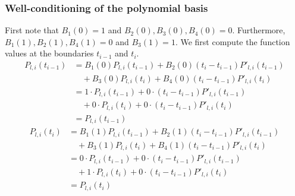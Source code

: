 \subsubsection{Well-conditioning of the polynomial basis}
\label{A:well_conditioning}
First note that $B_1(0) = 1$ and $B_2(0), B_3(0), B_4(0) = 0$. Furthermore, $B_1(1), B_2(1), B_4(1) = 0$ and $B_3(1) = 1$. We first compute the function values at the boundaries $t_{i-1}$ and $t_i$.
\begin{align*}
P_{l,i}(t_{i-1}) &= B_1(0) P_{l,i}(t_{i-1}) + B_2(0) (t_{i} - t_{i-1}) P'_{l,i}(t_{i-1})  \\& \quad + B_3(0) P_{l,i}(t_{i}) + B_4(0) (t_{i} - t_{i-1}) P'_{l,i}(t_{i}) \\
&=  1 \cdot P_{l,i}(t_{i-1}) + 0 \cdot (t_{i} - t_{i-1}) P'_{l,i}(t_{i-1})  \\& \quad + 0 \cdot P_{l,i}(t_{i}) + 0 \cdot (t_{i} - t_{i-1}) P'_{l,i}(t_{i})\\
&= P_{l,i}(t_{i-1}) 
\end{align*}
\begin{align*}
P_{l,i}(t_{i}) &= B_1(1) P_{l,i}(t_{i-1}) + B_2(1) (t_{i} - t_{i-1}) P'_{l,i}(t_{i-1})  \\& \quad + B_3(1) P_{l,i}(t_{i}) + B_4(1) (t_{i} - t_{i-1}) P'_{l,i}(t_{i}) \\ 
&= 0 \cdot P_{l,i}(t_{i-1}) + 0 \cdot (t_{i} - t_{i-1}) P'_{l,i}(t_{i-1})  \\& \quad + 1 \cdot  P_{l,i}(t_{i}) + 0 \cdot (t_{i} - t_{i-1}) P'_{l,i}(t_{i})  \\
&= P_{l,i}(t_{i})
\end{align*}

